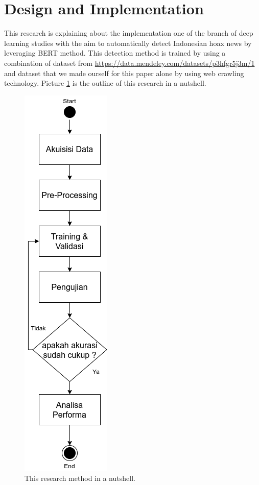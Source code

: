 \section{Design and Implementation}
\label{sec:designandimplementation}

This research is explaining about the implementation one of the branch of deep learning studies with the aim to automatically detect Indonesian hoax news by leveraging BERT method. This detection method is trained by using a combination of dataset from \url{https://data.mendeley.com/datasets/p3hfgr5j3m/1} and dataset that we made ourself for this paper alone by using web crawling technology. Picture \ref{fig:metodologi} is the outline of this research in a nutshell.

\begin{figure} [h]
    \centering
    \includegraphics[width=0.3\columnwidth]{gambar/metodologi_vertical.png}
    \caption{This research method in a nutshell.}
    \label{fig:metodologi}
\end{figure}

